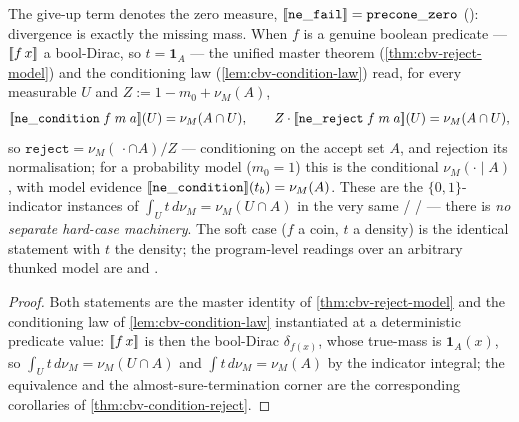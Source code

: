\begin{theorem}%
\label{thm:cbv-hard-reject-bridge}
\rocqok
{}\rocqok
{}\rocqok
{}\rocqok
{}\rocqok
{}\rocqok
{}
The give-up term denotes the zero measure,
$[\![ \mathtt{ne\_fail} ]\!] = \mathtt{precone\_zero}$
(): divergence is exactly
the missing mass. When $f$ is a genuine boolean predicate ---
$[\![ f\,x ]\!]$ a bool-Dirac, so $t = \mathbf 1_A$ --- the unified master
theorem (\autoref{thm:cbv-reject-model}) and the conditioning law
(\autoref{lem:cbv-condition-law}) read, for every measurable $U$ and
$Z := 1 - m_0 + \nu_M(A)$,
\[
  [\![ \mathtt{ne\_condition}\;f\;m\;a ]\!](U) = \nu_M(A \cap U),
  \qquad
  Z \cdot [\![ \mathtt{ne\_reject}\;f\;m\;a ]\!](U) = \nu_M(A \cap U),
\]
so $\mathtt{reject} = \nu_M(\,\cdot \cap A)/Z$ --- conditioning on the
accept set $A$, and rejection its normalisation; for a probability model
($m_0 = 1$) this is the conditional $\nu_M(\cdot \mid A)$, with model
evidence $[\![ \mathtt{ne\_condition} ]\!](t_b) = \nu_M(A)$. These are the
$\{0,1\}$-indicator instances of
$\int_U t\,d\nu_M = \nu_M(U \cap A)$ in the very same
 /
 /
 ---
there is \emph{no separate hard-case machinery}. The soft case ($f$ a
coin, $t$ a density) is the identical statement with $t$ the density;
the program-level readings over an arbitrary thunked model are
 and
.
\end{theorem}

\begin{proof}
Both statements are the master identity of \autoref{thm:cbv-reject-model}
and the conditioning law of \autoref{lem:cbv-condition-law} instantiated
at a deterministic predicate value: $[\![ f\,x ]\!]$ is then the bool-Dirac
$\delta_{f(x)}$, whose true-mass is $\mathbf 1_A(x)$, so
$\int_U t\,d\nu_M = \nu_M(U \cap A)$ and $\int t\,d\nu_M = \nu_M(A)$ by
the indicator integral; the equivalence and the almost-sure-termination
corner are the corresponding corollaries of
\autoref{thm:cbv-condition-reject}.
\end{proof}

